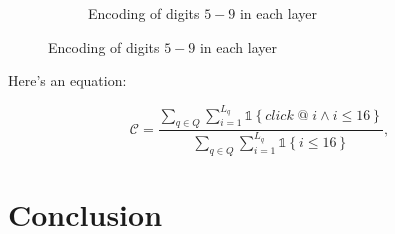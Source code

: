 \documentclass{article}
\begin{document}
\begin{figure}[htbp!]
\begin{subfigure}{.45\textwidth}
        \caption{Encoding of digits $5-9$ in each layer}
        \label{fig:incremental_5-9}
    \end{subfigure}
\end{figure}

Here's an equation:

\begin{equation}
    \mathscr{C} = \frac{\sum_{q \in Q}\sum_{i=1}^{L_q}\mathds{1}\left\{click\; @\; i \wedge i \leq 16\right\}}{\sum_{q \in Q}\sum_{i=1}^{L_q}\mathds{1}\left\{i \leq 16\right\}},
\end{equation}

\section{Conclusion}\label{sec:conclusion}

\nocite{*}
{}

\end{document}
